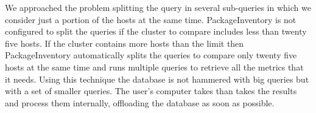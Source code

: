 We approached the problem splitting the query in several sub-queries in
which we consider just a portion of the hosts at the same time.
PackageInventory is not configured to split the queries if the cluster to
compare includes less than twenty five hosts. If the cluster contains more
hosts than the limit then PackageInventory automatically splits the
queries to compare only twenty five hosts at the same time and runs
multiple queries to retrieve all the metrics that it needs. Using this
technique the database is not hammered with big queries but with a set of
smaller queries. The user's computer takes than takes the results and
process them internally, offloading the database as soon as possible.
